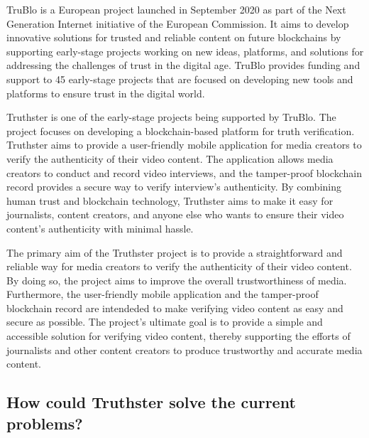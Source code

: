 \documentclass[target=mst,aauheader=]{thud}
\begin{document}
TruBlo is a European project launched in September 2020 as part of the Next Generation Internet initiative of the European Commission. It aims to develop innovative solutions for trusted and reliable content on future blockchains by supporting early-stage projects working on new ideas, platforms, and solutions for addressing the challenges of trust in the digital age. TruBlo provides funding and support to 45 early-stage projects \cite{trublo} that are focused on developing new tools and platforms to ensure trust in the digital world.\par
Truthster is one of the early-stage projects being supported by TruBlo. The project focuses on developing a blockchain-based platform for truth verification. Truthster aims to provide a user-friendly mobile application for media creators to verify the authenticity of their video content. The application allows media creators to conduct and record video interviews, and the tamper-proof blockchain record provides a secure way to verify interview's authenticity. By combining human trust and blockchain technology, Truthster aims to make it easy for journalists, content creators, and anyone else who wants to ensure their video content's authenticity with minimal hassle.\par
The primary aim of the Truthster project is to provide a straightforward and reliable way for media creators to verify the authenticity of their video content. By doing so, the project aims to improve the overall trustworthiness of media. Furthermore, the user-friendly mobile application and the tamper-proof blockchain record are intendeded to make verifying video content as easy and secure as possible. The project's ultimate goal is to provide a simple and accessible solution for verifying video content, thereby supporting the efforts of journalists and other content creators to produce trustworthy and accurate media content.

\subsection{How could Truthster solve the current problems?}
\end{document}
